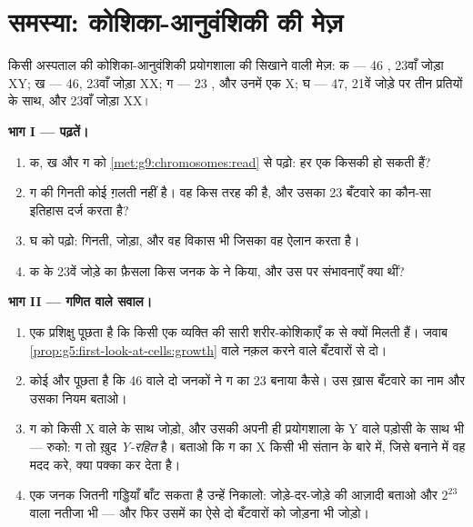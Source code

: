 \section{समस्या: कोशिका-आनुवंशिकी की मेज़}

\begin{problem}[{सप्ताहांत समस्या --- एक ही रोशनी वाली मेज़ पर चार
गुणसूत्र-चित्र}]\label{pb:g9:chromosomes:1}
किसी अस्पताल की कोशिका-आनुवंशिकी प्रयोगशाला की सिखाने वाली मेज़:
 क --- 46 , 23वाँ जोड़ा XY; ख --- 46, 23वाँ जोड़ा
XX; ग --- 23 , और उनमें एक X; घ --- 47, 21वें जोड़े पर तीन
प्रतियों के साथ, और 23वाँ जोड़ा XX।

\medskip\noindent\textbf{भाग I --- पढ़तें।}
\begin{enumerate}
  \item क, ख और ग को \cref{met:g9:chromosomes:read} से पढ़ो: हर एक
        किसकी  हो सकती हैं?
  \item ग की गिनती कोई ग़लती नहीं है। वह किस तरह की  है, और
        उसका 23 बँटवारे का कौन-सा इतिहास दर्ज करता है?
  \item घ को पढ़ो: गिनती, जोड़ा, और वह विकास भी जिसका वह ऐलान करता है।
  \item क के 23वें जोड़े का फ़ैसला किस जनक के  ने किया, और उस
         पर संभावनाएँ क्या थीं?
\end{enumerate}

\medskip\noindent\textbf{भाग II --- गणित वाले सवाल।}
\begin{enumerate}[resume]
  \item एक प्रशिक्षु पूछता है कि किसी एक व्यक्ति की सारी शरीर-कोशिकाएँ
         क से क्यों मिलती हैं। जवाब
        \cref{prop:g5:first-look-at-cells:growth} वाले नक़ल करने वाले
        बँटवारों से दो।
  \item कोई और पूछता है कि 46  वाले दो जनकों ने ग का 23 बनाया
        कैसे। उस ख़ास बँटवारे का नाम और उसका नियम बताओ।
  \item ग को किसी X वाले  के साथ जोड़ो, और उसकी अपनी ही
        प्रयोगशाला के Y वाले पड़ोसी के साथ भी --- रुको: ग तो ख़ुद
        \emph{Y-रहित} है। बताओ कि ग का X किसी भी संतान के बारे में,
        जिसे बनाने में वह मदद करे, क्या पक्का कर देता है।
  \item एक जनक जितनी गड्डियाँ बाँट सकता है उन्हें निकालो:
        जोड़े-दर-जोड़े की आज़ादी बताओ और $2^{23}$ वाला नतीजा भी ---
        और फिर उसमें  का ऐसे दो बँटवारों को जोड़ना भी जोड़ो।
\end{enumerate}


\end{problem}
